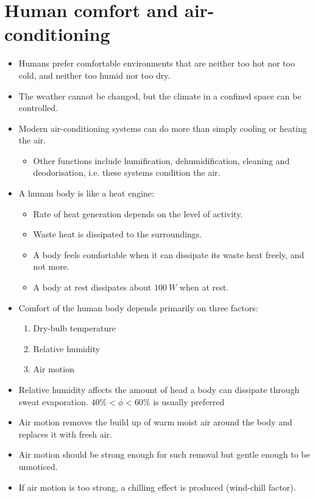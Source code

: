\documentclass[11pt]{article}
\begin{document}
 \newpage
\section{Human comfort and air-conditioning}
\label{sec:org747ee1d}
\begin{itemize}
\item Humans prefer comfortable environments that are neither too hot nor too cold, and neither too humid nor too dry.
\item The weather cannot be changed, but the climate in a confined space can be controlled.
\item Modern air-conditioning systems can do more than simply cooling or heating the air.
\begin{itemize}
\item Other functions include humification, dehumidification, cleaning and deodorisation, i.e. these systems condition the air.
\end{itemize}
\item A human body is like a heat engine:
\begin{itemize}
\item Rate of heat generation depends on the level of activity.
\item Waste heat is dissipated to the surroundings.
\item A body feels comfortable when it can dissipate its waste heat freely, and not more.
\item A body at rest dissipates about \(\qty{100}{W}\) when at rest.
\end{itemize}
\item Comfort of the human body depends primarily on three factors:
\begin{enumerate}
\item Dry-bulb temperature
\item Relative humidity
\item Air motion
\end{enumerate}
\item Relative humidity affects the amount of head a body can dissipate through sweat evaporation. \(40\% < \phi < 60\%\) is usually preferred
\item Air motion removes the build up of warm moist air around the body and replaces it with fresh air.
\item Air motion should be strong enough for such removal but gentle enough to be unnoticed.
\item If air motion is too strong, a chilling effect is produced (wind-chill factor).
\end{itemize}
\end{document}
